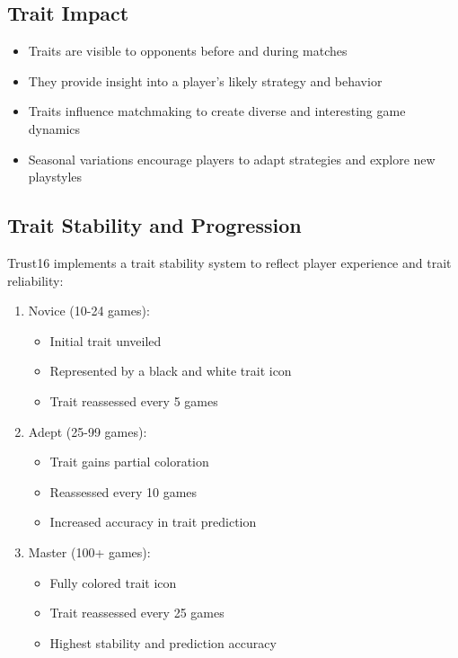 \documentclass[]{article}
\begin{document}
\subsection{Trait Impact}

\begin{itemize}
\item Traits are visible to opponents before and during matches
\item They provide insight into a player's likely strategy and behavior
\item Traits influence matchmaking to create diverse and interesting game dynamics
\item Seasonal variations encourage players to adapt strategies and explore new playstyles
\end{itemize}

\subsection{Trait Stability and Progression}

Trust16 implements a trait stability system to reflect player experience and trait reliability:

\begin{enumerate}
\item Novice (10-24 games):
   \begin{itemize}
   \item Initial trait unveiled
   \item Represented by a black and white trait icon
   \item Trait reassessed every 5 games
   \end{itemize}
\item Adept (25-99 games):
   \begin{itemize}
   \item Trait gains partial coloration
   \item Reassessed every 10 games
   \item Increased accuracy in trait prediction
   \end{itemize}
\item Master (100+ games):
   \begin{itemize}
   \item Fully colored trait icon
   \item Trait reassessed every 25 games
   \item Highest stability and prediction accuracy
   \end{itemize}
\end{enumerate}
\end{document}

